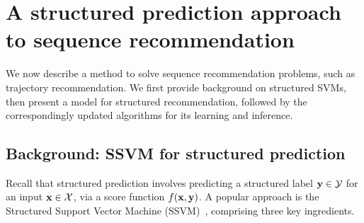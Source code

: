 \section{A structured prediction approach to sequence recommendation}
\label{sec:recseq}

We now describe a method to
solve sequence recommendation problems, such as trajectory recommendation.
We first provide background on structured SVMs, %
then present a model for structured recommendation, %
followed by the correspondingly updated algorithms for its learning %
and inference. %


\subsection{Background: SSVM for structured prediction}
\label{ssec:ssvm}

Recall that structured prediction involves predicting a structured label $\mathbf{y} \in \mathcal{Y}$ for an input $\mathbf{x} \in \mathcal{X}$,
via a score function $f(\mathbf{x},\mathbf{y})$.
A popular approach is the Structured Support Vector Machine (SSVM)~\cite{taskar2004max,tsochantaridis2004support}, 
comprising three key ingredients.

